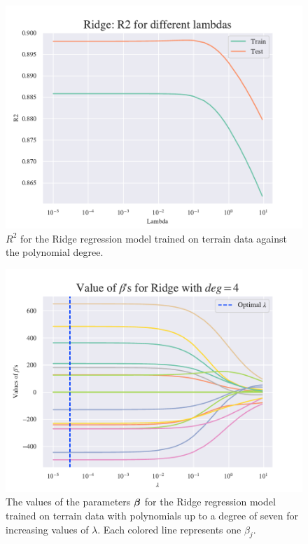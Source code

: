 \begin{figure}[H]
    \centering
    \includegraphics[width=1\linewidth]{project_1/figures/figures_in_appendix/Ridge_R2_terrain.pdf}
    \caption{$R^2$ for the Ridge regression model trained on terrain data against the polynomial degree.}
    \label{fig:ref11}
\end{figure}

\begin{figure}[H]
    \centering
    \includegraphics[width=1\linewidth]{project_1/figures/figures_in_appendix/Ridge_Betas_lambda_terrain_const_deg.pdf}
    \caption{The values of the parameters $\boldsymbol{\beta}$ for the Ridge regression model trained on terrain data with polynomials up to a degree of seven for increasing values of $\lambda$. Each colored line represents one $\beta_j$.}
    \label{fig:ref12}
\end{figure}

